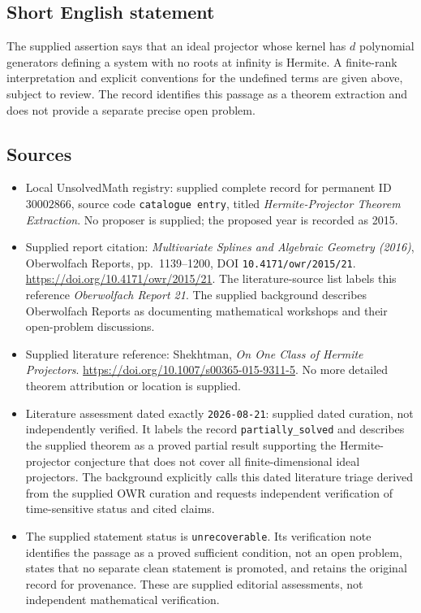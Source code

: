 \documentclass[11pt]{article}
\begin{document}
\subsection{Short English statement}
The supplied assertion says that an ideal projector whose kernel has \(d\) polynomial generators defining a system with no roots at infinity is Hermite. A finite-rank interpretation and explicit conventions for the undefined terms are given above, subject to review. The record identifies this passage as a theorem extraction and does not provide a separate precise open problem.
\subsection{Sources}
\begin{itemize}
\item Local UnsolvedMath registry: supplied complete record for permanent ID \(30002866\), source code \texttt{catalogue entry}, titled \emph{Hermite-Projector Theorem Extraction}. No proposer is supplied; the proposed year is recorded as 2015.
\item Supplied report citation: \emph{Multivariate Splines and Algebraic Geometry (2016)}, Oberwolfach Reports, pp.\ 1139--1200, DOI \texttt{10.4171/owr/2015/21}. \url{https://doi.org/10.4171/owr/2015/21}. The literature-source list labels this reference \emph{Oberwolfach Report 21}. The supplied background describes Oberwolfach Reports as documenting mathematical workshops and their open-problem discussions.
\item Supplied literature reference: Shekhtman, \emph{On One Class of Hermite Projectors}. \url{https://doi.org/10.1007/s00365-015-9311-5}. No more detailed theorem attribution or location is supplied.
\item Literature assessment dated exactly \texttt{2026-08-21}: supplied dated curation, not independently verified. It labels the record \texttt{partially\_solved} and describes the supplied theorem as a proved partial result supporting the Hermite-projector conjecture that does not cover all finite-dimensional ideal projectors. The background explicitly calls this dated literature triage derived from the supplied OWR curation and requests independent verification of time-sensitive status and cited claims.
\item The supplied statement status is \texttt{unrecoverable}. Its verification note identifies the passage as a proved sufficient condition, not an open problem, states that no separate clean statement is promoted, and retains the original record for provenance. These are supplied editorial assessments, not independent mathematical verification.
\end{itemize}
\end{document}
